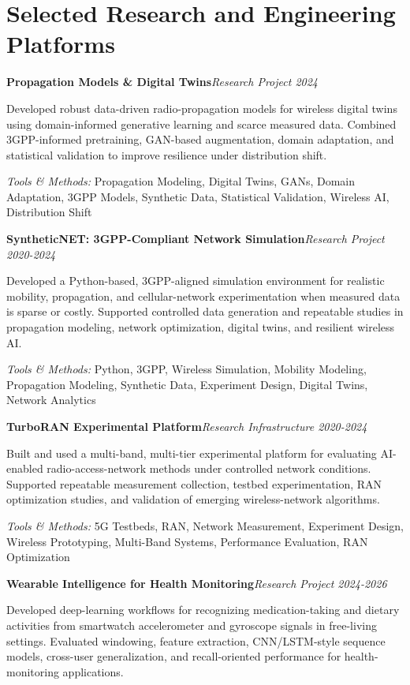 \documentclass[8pt,letterpaper]{extarticle}
\newcommand{\entry}[2]{\Needspace{4\baselineskip}\textbf{#1}\hfill\textit{#2}\par}
\begin{document}
\section{Selected Research and Engineering Platforms}
\entry{Propagation Models \& Digital Twins}{Research Project \textbar{} 2024}
Developed robust data-driven radio-propagation models for wireless digital twins using domain-informed generative learning and scarce measured data. Combined 3GPP-informed pretraining, GAN-based augmentation, domain adaptation, and statistical validation to improve resilience under distribution shift.\par
{\small\textit{Tools \& Methods:} Propagation Modeling, Digital Twins, GANs, Domain Adaptation, 3GPP Models, Synthetic Data, Statistical Validation, Wireless AI, Distribution Shift\par}
\vspace{1pt}
\entry{SyntheticNET: 3GPP-Compliant Network Simulation}{Research Project \textbar{} 2020-2024}
Developed a Python-based, 3GPP-aligned simulation environment for realistic mobility, propagation, and cellular-network experimentation when measured data is sparse or costly. Supported controlled data generation and repeatable studies in propagation modeling, network optimization, digital twins, and resilient wireless AI.\par
{\small\textit{Tools \& Methods:} Python, 3GPP, Wireless Simulation, Mobility Modeling, Propagation Modeling, Synthetic Data, Experiment Design, Digital Twins, Network Analytics\par}
\vspace{1pt}
\entry{TurboRAN Experimental Platform}{Research Infrastructure \textbar{} 2020-2024}
Built and used a multi-band, multi-tier experimental platform for evaluating AI-enabled radio-access-network methods under controlled network conditions. Supported repeatable measurement collection, testbed experimentation, RAN optimization studies, and validation of emerging wireless-network algorithms.\par
{\small\textit{Tools \& Methods:} 5G Testbeds, RAN, Network Measurement, Experiment Design, Wireless Prototyping, Multi-Band Systems, Performance Evaluation, RAN Optimization\par}
\vspace{1pt}
\entry{Wearable Intelligence for Health Monitoring}{Research Project \textbar{} 2024-2026}
Developed deep-learning workflows for recognizing medication-taking and dietary activities from smartwatch accelerometer and gyroscope signals in free-living settings. Evaluated windowing, feature extraction, CNN/LSTM-style sequence models, cross-user generalization, and recall-oriented performance for health-monitoring applications.\par
\end{document}
